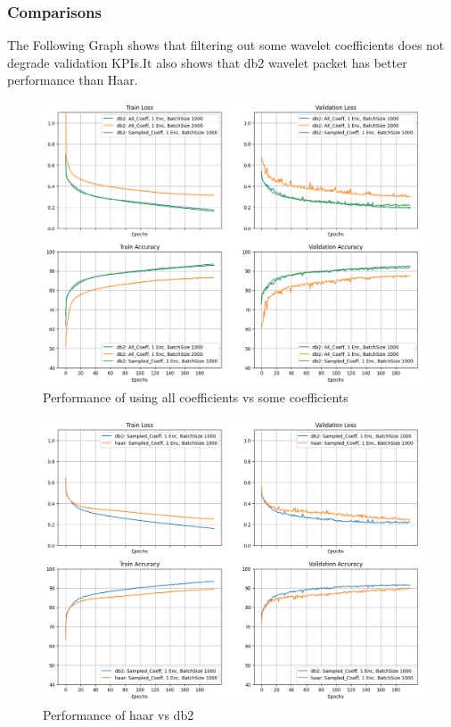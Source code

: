 \documentclass{svproc}
\begin{document}
\subsubsection{Comparisons}
\noindent
The Following Graph shows that filtering out some wavelet coefficients does not degrade validation KPIs.It also shows that db2 wavelet packet has better performance than Haar.
\begin{figure}[H]
  \centering
    \includegraphics[width=0.7\linewidth]{figures/compare_all.png}
    \caption{Performance of using all coefficients vs some coefficients}
    \label{fig:exp1_model}
\end{figure}
\begin{figure}[H]
  \centering
    \includegraphics[width=0.7\linewidth]{figures/compare_slices.png}
    \caption{Performance of haar vs db2 }
    \label{fig:exp1_model}
\end{figure}
\end{document}
